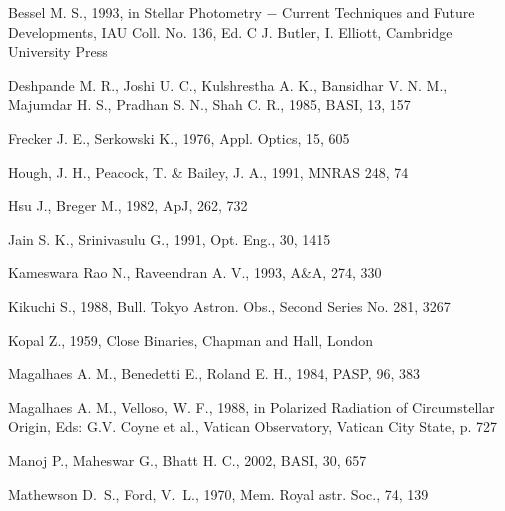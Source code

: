 {{{{{{{{{{{{{ {Bessel M. S., 1993, in  Stellar Photometry $-$
         Current Techniques and Future Developments, IAU Coll. No. 136, Ed. C J. Butler, I. Elliott, Cambridge University Press }

         {Deshpande M. R., Joshi U. C., Kulshrestha A. K., Bansidhar V. N. M.,
          Majumdar H. S., Pradhan S. N., Shah C. R., 1985,  BASI,  13, 157}

         {Frecker J. E., Serkowski K., 1976,  Appl. Optics, 15, 605}

          {Hough, J. H., Peacock, T. \& Bailey, J. A., 1991, MNRAS 248, 74}

          {Hsu J., Breger M., 1982, ApJ, 262, 732}

          {Jain S. K., Srinivasulu G., 1991,  Opt. Eng., 30, 1415}

           {Kameswara Rao N., Raveendran A. V., 1993, A\&A, 274, 330}

          {Kikuchi S., 1988,  Bull. Tokyo Astron. Obs., Second Series No. 281, 3267}

 {Kopal Z., 1959, Close Binaries, Chapman and Hall, London}

          {Magalhaes A. M., Benedetti E., Roland E. H., 1984, PASP, 96, 383}

          {Magalhaes A. M., Velloso, W. F., 1988, in  Polarized
          Radiation of Circumstellar Origin, Eds: G.V. Coyne et al.,
           Vatican Observatory, Vatican City State, p. 727}

          {Manoj P., Maheswar G., Bhatt H. C., 2002, BASI, 30, 657}

         {Mathewson D.~S., Ford, V.~L., 1970, Mem. Royal astr. Soc.,  74, 139}


}}}}}}}}}}}}}
